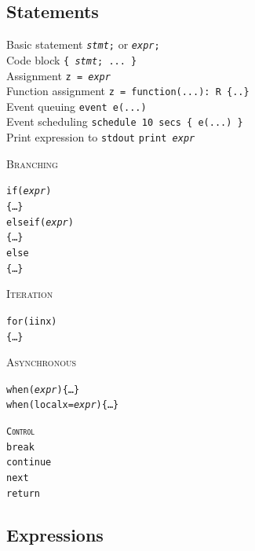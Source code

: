 \documentclass[10pt,landscape]{article}
\newcommand{\minisec}[1]{\textsc{#1}\\}
\begin{document}
\begin{multicols*}{3}
\subsection*{Statements}

Basic statement \dotfill
  \texttt{\textit{stmt};} or \texttt{\textit{expr};}\\
Code block \dotfill \texttt{\{ \textit{stmt}; ... \}}\\
Assignment \dotfill \texttt{z = \textit{expr}}\\
Function assignment \dotfill \texttt{z~=~function(...):~R~\{..\}}\\
Event queuing \dotfill \verb|event e(...)|\\
Event scheduling \dotfill \verb|schedule 10 secs { e(...) }|\\
Print expression to \texttt{stdout} \dotfill \texttt{print \textit{expr}}\\

\vspace{-10pt}
\begin{multicols*}{3}
\textsc{Branching}
\begin{alltt}
if (\textit{expr})
    \{ \ldots \}
else if (\textit{expr})
    \{ \ldots \}
else
    \{ \ldots \}
\end{alltt}

\textsc{Iteration}
\begin{alltt}
for (i in x)
    \{ \ldots \}
\end{alltt}

\textsc{Asynchronous}
\begin{alltt}
when (\textit{expr}) \{ \ldots \}
when (local x = \textit{expr}) \{ \ldots \}
\end{alltt}
\vspace{-10pt}

\begin{alltt}
\textsc{Control}\vspace{5pt}
break
continue
next
return
\end{alltt}
\end{multicols*}

\subsection*{Expressions}


\end{multicols*}
\end{document}
